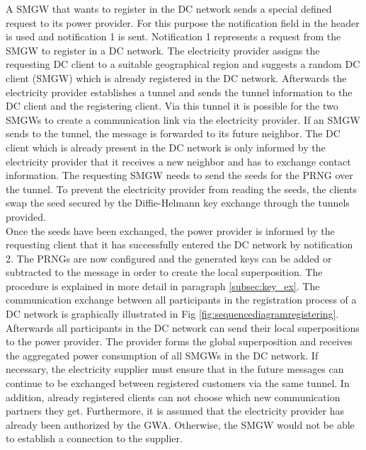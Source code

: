 A \gls{SMGW} that wants to register in the DC network sends a special defined request to its power provider. For this purpose the notification field in the header is used and notification 1 is sent. Notification 1 represents a request from the \gls{SMGW} to register in a DC network. The electricity provider assigns the requesting DC client to a suitable geographical region and suggests a random DC client (\gls{SMGW}) which is already registered in the DC network. Afterwards the electricity provider establishes a tunnel and sends the tunnel information to the DC client and the registering client. Via this tunnel it is possible for the two \gls{SMGW}s to create a communication link via the electricity provider. If an \gls{SMGW} sends to the tunnel, the message is forwarded to its future neighbor. The DC client which is already present in the DC network is only informed by the electricity provider that it receives a new neighbor and has to exchange contact information. The requesting \gls{SMGW} needs to send the seeds for the \gls{PRNG} over the tunnel. To prevent the electricity provider from reading the seeds, the clients swap the seed secured by the Diffie-Helmann key exchange through the tunnels provided.\\%
Once the seeds have been exchanged, the power provider is informed by the requesting client that it has successfully entered the DC network by notification 2. The \gls{PRNG}s are now configured and the generated keys can be added or subtracted to the message in order to create the local superposition. The procedure is explained in more detail in paragraph \ref{subsec:key_ex}.%
The communication exchange between all participants in the registration process of a DC network is graphically illustrated in Fig \ref{fig:sequencediagramregistering}. %
Afterwards all participants in the DC network can send their local superpositions to the power provider. The provider forms the global superposition and receives the aggregated power consumption of all \gls{SMGW}s in the DC network. If necessary, the electricity supplier must ensure that in the future messages can continue to be exchanged between registered customers via the same tunnel. In addition, already registered clients can not choose which new communication partners they get. Furthermore, it is assumed that the electricity provider has already been authorized by the \gls{GWA}. Otherwise, the \gls{SMGW} would not be able to establish a connection to the supplier.\\
